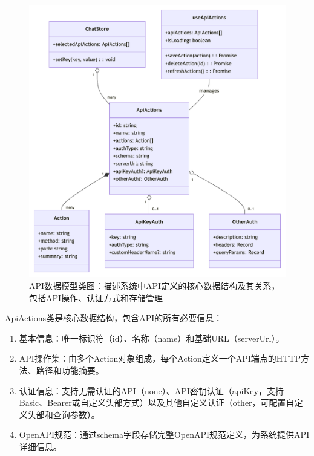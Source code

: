 \begin{figure}[H]
  \centering
  \includegraphics[width=\textwidth]{figures/api_actions_class.pdf}
  \caption{API数据模型类图：描述系统中API定义的核心数据结构及其关系，包括API操作、认证方式和存储管理}
  \label{fig:api_actions_class}
\end{figure}

ApiActions类是核心数据结构，包含API的所有必要信息：

\begin{enumerate}
  \item 基本信息：唯一标识符（id）、名称（name）和基础URL（serverUrl）。
  
  \item API操作集：由多个Action对象组成，每个Action定义一个API端点的HTTP方法、路径和功能摘要。
  
  \item 认证信息：支持无需认证的API（none）、API密钥认证（apiKey，支持Basic、Bearer或自定义头部方式）以及其他自定义认证（other，可配置自定义头部和查询参数）。
  
  \item OpenAPI规范：通过schema字段存储完整OpenAPI规范定义，为系统提供API详细信息。
\end{enumerate}


